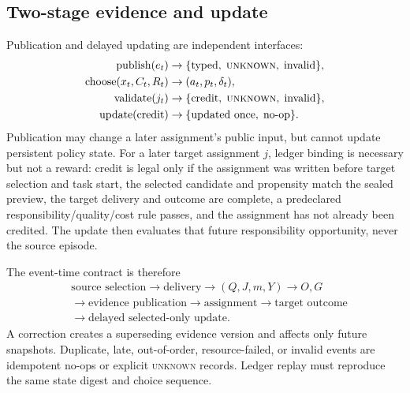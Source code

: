 \documentclass[sigconf,anonymous]{aamas}
\newcommand{\unknown}{\textsc{unknown}}
\begin{document}
\subsection{Two-stage evidence and update}
Publication and delayed updating are independent interfaces:
\begin{align}
 \operatorname{publish}(e_t)&\rightarrow \{\text{typed},\;\unknown{},\;\text{invalid}\},\\
 \operatorname{choose}(x_t,C_t,R_t)&\rightarrow (a_t,p_t,\delta_t),\\
 \operatorname{validate}(j_t)&\rightarrow \{\text{credit},\;\unknown{},\;\text{invalid}\},\\
 \operatorname{update}(\text{credit})&\rightarrow \{\text{updated once},\;\text{no-op}\}.
 \label{eq:interfaces}
\end{align}
Publication may change a later assignment's public input, but cannot update persistent policy state. For a later target assignment $j$, ledger binding is necessary but not a reward: credit is legal only if the assignment was written before target selection and task start, the selected candidate and propensity match the sealed preview, the target delivery and outcome are complete, a predeclared responsibility/quality/cost rule passes, and the assignment has not already been credited. The update then evaluates that future responsibility opportunity, never the source episode.

The event-time contract is therefore
\begin{equation}
\begin{aligned}
&\text{source selection}\rightarrow\text{delivery}\rightarrow(Q,J,m,Y)\rightarrow O,G\\
&\rightarrow\text{evidence publication}\rightarrow\text{assignment}\rightarrow\text{target outcome}\\
&\rightarrow\text{delayed selected-only update}.
\end{aligned}
\label{eq:timeline}
\end{equation}
A correction creates a superseding evidence version and affects only future snapshots. Duplicate, late, out-of-order, resource-failed, or invalid events are idempotent no-ops or explicit \unknown{} records. Ledger replay must reproduce the same state digest and choice sequence.
\end{document}
